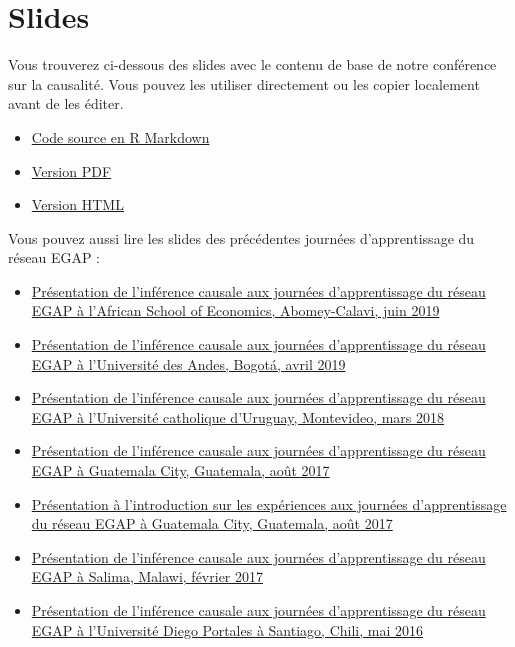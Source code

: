 \documentclass[12pt,]{book}
\begin{document}
\hypertarget{slides-1}{%
\section{Slides}\label{slides-1}}

Vous trouverez ci-dessous des slides avec le contenu de base de notre conférence sur la causalité. Vous pouvez les utiliser directement ou les copier localement avant de les éditer.

\begin{itemize}
\item
  \href{https://egap.github.io/learningdays-resources/Slides_fr/causalinference-slides.Rmd}{Code source en R Markdown}
\item
  \href{https://egap.github.io/learningdays-resources/Slides_fr/causalinference-slides.pdf}{Version PDF}
\item
  \href{https://egap.github.io/learningdays-resources/Slides_fr/causalinference-slides.html}{Version HTML}
\end{itemize}

Vous pouvez aussi lire les slides des précédentes journées d'apprentissage du réseau EGAP :

\begin{itemize}
\item
  \href{https://egap.github.io/learningdays-resources/Slides/Examples/causality-benin.pdf}{Présentation de l'inférence causale aux journées d'apprentissage du réseau EGAP à l'African School of Economics, Abomey-Calavi, juin 2019}
\item
  \href{https://egap.github.io/learningdays-resources/Slides/Examples/causality-bogota.pdf}{Présentation de l'inférence causale aux journées d'apprentissage du réseau EGAP à l'Université des Andes, Bogotá, avril 2019}
\item
  \href{https://egap.github.io/learningdays-resources/Slides/Examples/causality-montevideo.pdf}{Présentation de l'inférence causale aux journées d'apprentissage du réseau EGAP à l'Université catholique d'Uruguay, Montevideo, mars 2018}
\item
  \href{https://egap.github.io/learningdays-resources/Slides/Examples/causality-guatemala.pdf}{Présentation de l'inférence causale aux journées d'apprentissage du réseau EGAP à Guatemala City, Guatemala, août 2017}
\item
  \href{https://egap.github.io/learningdays-resources/Slides/Examples/intro_experiments-guatemala.pdf}{Présentation à l'introduction sur les expériences aux journées d'apprentissage du réseau EGAP à Guatemala City, Guatemala, août 2017}
\item
  \href{https://egap.github.io/learningdays-resources/Slides/Examples/causality-malawi.pdf}{Présentation de l'inférence causale aux journées d'apprentissage du réseau EGAP à Salima, Malawi, février 2017}
\item
  \href{https://egap.github.io/learningdays-resources/Slides/Examples/causality-santiago.pdf}{Présentation de l'inférence causale aux journées d'apprentissage du réseau EGAP à l'Université Diego Portales à Santiago, Chili, mai 2016}
\end{itemize}
\end{document}
